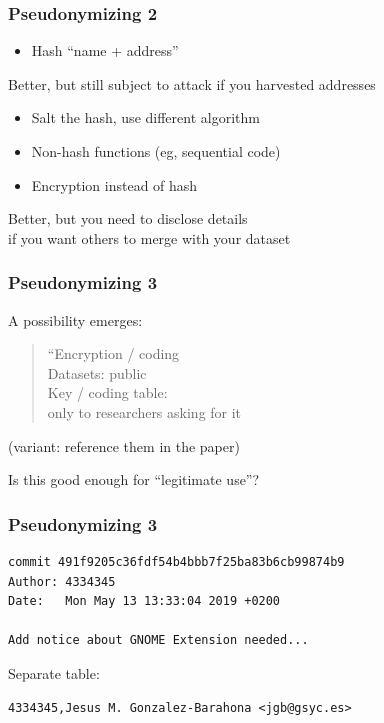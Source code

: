 \documentclass[17pt,aspectratio=169,hyperref={pdfusetitle,colorlinks,allcolors=olive}]{beamer}
\begin{document}
\begin{frame}[fragile]
  \frametitle{Pseudonymizing 2}

  \begin{itemize}
  \item Hash ``name + address'' \\
  \end{itemize}

  Better, but still subject to attack if you harvested addresses

  \begin{itemize}
  \item Salt the hash, use different algorithm \\
  \item Non-hash functions (eg, sequential code)
  \item Encryption instead of hash
  \end{itemize}

  Better, but you need to disclose details \\
  if you want others to merge with your dataset

\end{frame}

\begin{frame}[fragile]
  \frametitle{Pseudonymizing 3}

  A possibility emerges:

  \begin{quotation}
    ``Encryption / coding \\
    \vspace{.3cm}
    Datasets: public \\
    Key / coding table: \\
    only to researchers asking for it \\
  \end{quotation}

    (variant: reference them in the paper) \\
    \vspace{.3cm}

  Is this good enough for ``legitimate use''? \\
\end{frame}

\begin{frame}[fragile]
  \frametitle{Pseudonymizing 3}

{\small
\begin{verbatim}
commit 491f9205c36fdf54b4bbb7f25ba83b6cb99874b9
Author: 4334345
Date:   Mon May 13 13:33:04 2019 +0200

Add notice about GNOME Extension needed...
\end{verbatim}  
}

Separate table:

{\small
\begin{verbatim}
4334345,Jesus M. Gonzalez-Barahona <jgb@gsyc.es>
\end{verbatim}  
}

\end{frame}
\end{document}

